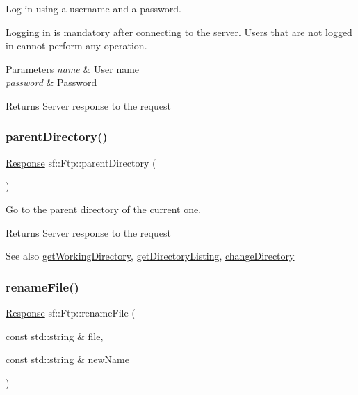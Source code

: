 Log in using a username and a password. 

Logging in is mandatory after connecting to the server. Users that are not logged in cannot perform any operation.


\begin{DoxyParams}{Parameters}
{\em name} & User name \\
\hline
{\em password} & Password\\
\hline
\end{DoxyParams}
\begin{DoxyReturn}{Returns}
Server response to the request 
\end{DoxyReturn}
\mbox{\label{classsf_1_1_ftp_ad295cf77f30f9ad07b5c401fd9849189}} 
\subsubsection{\texorpdfstring{parent\+Directory()}{parentDirectory()}}
{\footnotesize\ttfamily \hyperlink{classsf_1_1_ftp_1_1_response}{Response} sf\+::\+Ftp\+::parent\+Directory (\begin{DoxyParamCaption}{ }\end{DoxyParamCaption})}



Go to the parent directory of the current one. 

\begin{DoxyReturn}{Returns}
Server response to the request
\end{DoxyReturn}
\begin{DoxySeeAlso}{See also}
\hyperlink{classsf_1_1_ftp_a79c654fcdd0c81e68c4fa29af3b45e0c}{get\+Working\+Directory}, \hyperlink{classsf_1_1_ftp_a8f37258e461fcb9e2a0655e9df0be4a0}{get\+Directory\+Listing}, \hyperlink{classsf_1_1_ftp_a7e93488ea6330dd4dd76e428da9bb6d3}{change\+Directory} 
\end{DoxySeeAlso}
\mbox{\label{classsf_1_1_ftp_a8f99251d7153e1dc26723e4006deb764}} 
\subsubsection{\texorpdfstring{rename\+File()}{renameFile()}}
{\footnotesize\ttfamily \hyperlink{classsf_1_1_ftp_1_1_response}{Response} sf\+::\+Ftp\+::rename\+File (\begin{DoxyParamCaption}\item[{const std\+::string \&}]{file,  }\item[{const std\+::string \&}]{new\+Name }\end{DoxyParamCaption})}



